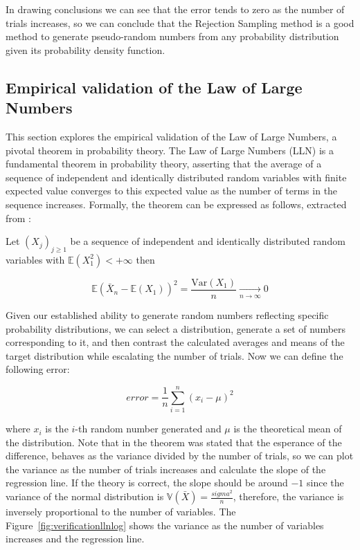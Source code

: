 \documentclass{article}
\begin{document}
In drawing conclusions we can see that the error tends to zero as the number of trials increases, so we can conclude that the Rejection Sampling method is a good method to generate pseudo-random numbers from any probability distribution given its probability density function.

\subsection{Empirical validation of the Law of Large Numbers}
\label{sec:lln}

This section explores the empirical validation of the Law of Large Numbers, a pivotal theorem in probability theory. The Law of Large Numbers (LLN) is a fundamental theorem in probability theory, asserting that the average of a sequence of independent and identically distributed random variables with finite expected value converges to this expected value as the number of terms in the sequence increases. Formally, the theorem can be expressed as follows, extracted from \cite{jourdain2016probabilites}:

\begin{theorem}
	Let $(X_j)_{j \geq 1}$ be a sequence of independent and identically distributed random variables with $\mathbb{E}(X_1^2) < + \infty$ then

	\begin{equation}
		\mathbb{E}(\bar{X}_n - \mathbb{E}(X_1))^2 = \frac{\mathrm{Var}(X_1)}{n} \xrightarrow[n \to \infty]{} 0
	\end{equation}
\end{theorem}

Given our established ability to generate random numbers reflecting specific probability distributions, we can select a distribution, generate a set of numbers corresponding to it, and then contrast the calculated averages and means of the target distribution while escalating the number of trials. Now we can define the following error:

\begin{equation} 
	error = \frac{1}{n}\sum_{i=1}^{n} (x_i - \mu)^2
\end{equation}

where \(x_i\) is the \(i\)-th random number generated and \(\mu\) is the theoretical mean of the distribution. Note that in the theorem was stated that the esperance of the difference, behaves as the variance divided by the number of trials, so we can plot the variance as the number of trials increases and calculate the slope of the regression line. If the theory is correct, the slope should be around \(-1\) since the variance of the normal distribution is \(\mathbb{V}(\bar{X}) = \frac{sigma^2}{n}\), therefore, the variance is inversely proportional to the number of variables. The Figure~\ref{fig:verificationllnlog} shows the variance as the number of variables increases and the regression line.
\end{document}
